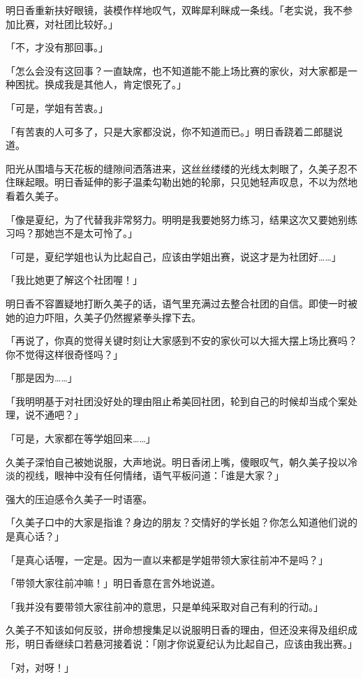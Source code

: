 \documentclass[UTF8]{ctexart}
\begin{document}
    明日香重新扶好眼镜，装模作样地叹气，双眸犀利眯成一条线。「老实说，我不参加比赛，对社团比较好。」 

    「不，才没有那回事。」 

    「怎么会没有这回事？一直缺席，也不知道能不能上场比赛的家伙，对大家都是一种困扰。换成我是其他人，肯定恨死了。」 

    「可是，学姐有苦衷。」 

    「有苦衷的人可多了，只是大家都没说，你不知道而已。」明日香跷着二郎腿说道。 

    阳光从围墙与天花板的缝隙间洒落进来，这丝丝缕缕的光线太刺眼了，久美子忍不住眯起眼。明日香延伸的影子温柔勾勒出她的轮廓，只见她轻声叹息，不以为然地看着久美子。 

    「像是夏纪，为了代替我非常努力。明明是我要她努力练习，结果这次又要她别练习吗？那她岂不是太可怜了。」 

    「可是，夏纪学姐也认为比起自己，应该由学姐出赛，说这才是为社团好……」 

    「我比她更了解这个社团喔！」 

    明日香不容置疑地打断久美子的话，语气里充满过去整合社团的自信。即使一时被她的迫力吓阻，久美子仍然握紧拳头撑下去。 

    「再说了，你真的觉得关键时刻让大家感到不安的家伙可以大摇大摆上场比赛吗？你不觉得这样很奇怪吗？」 

    「那是因为……」 

    「我明明基于对社团没好处的理由阻止希美回社团，轮到自己的时候却当成个案处理，说不通吧？」 

    「可是，大家都在等学姐回来……」 

    久美子深怕自己被她说服，大声地说。明日香闭上嘴，傻眼叹气，朝久美子投以冷淡的视线，眼神中没有任何情绪，语气平板问道：「谁是大家？」 

    强大的压迫感令久美子一时语塞。 

    「久美子口中的大家是指谁？身边的朋友？交情好的学长姐？你怎么知道他们说的是真心话？」 

    「是真心话喔，一定是。因为一直以来都是学姐带领大家往前冲不是吗？」 

    「带领大家往前冲嘛！」明日香意在言外地说道。 

    「我并没有要带领大家往前冲的意思，只是单纯采取对自己有利的行动。」 

    久美子不知该如何反驳，拼命想搜集足以说服明日香的理由，但还没来得及组织成形，明日香继续口若悬河接着说：「刚才你说夏纪认为比起自己，应该由我出赛。」 

    「对，对呀！」 
\end{document}
